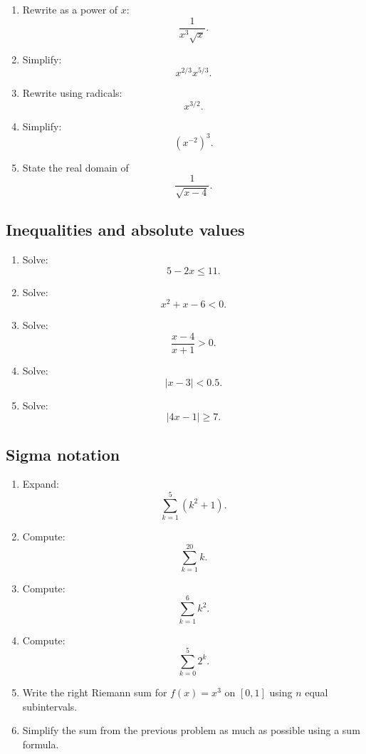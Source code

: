 \begin{enumerate}
\item Rewrite as a power of \(x\):
\[
\frac{1}{x^3\sqrt{x}}.
\]

\item Simplify:
\[
x^{2/3}x^{5/3}.
\]

\item Rewrite using radicals:
\[
x^{3/2}.
\]

\item Simplify:
\[
\left(x^{-2}\right)^3.
\]

\item State the real domain of
\[
\frac{1}{\sqrt{x-4}}.
\]
\end{enumerate}

\subsection*{Inequalities and absolute values}

\begin{enumerate}
\item Solve:
\[
5-2x\le 11.
\]

\item Solve:
\[
x^2+x-6<0.
\]

\item Solve:
\[
\frac{x-4}{x+1}>0.
\]

\item Solve:
\[
|x-3|<0.5.
\]

\item Solve:
\[
|4x-1|\ge 7.
\]
\end{enumerate}

\subsection*{Sigma notation}

\begin{enumerate}
\item Expand:
\[
\sum_{k=1}^{5}(k^2+1).
\]

\item Compute:
\[
\sum_{k=1}^{20} k.
\]

\item Compute:
\[
\sum_{k=1}^{6} k^2.
\]

\item Compute:
\[
\sum_{k=0}^{5} 2^k.
\]

\item Write the right Riemann sum for \(f(x)=x^3\) on \([0,1]\) using \(n\) equal
subintervals.

\item Simplify the sum from the previous problem as much as possible using a sum
formula.
\end{enumerate}

